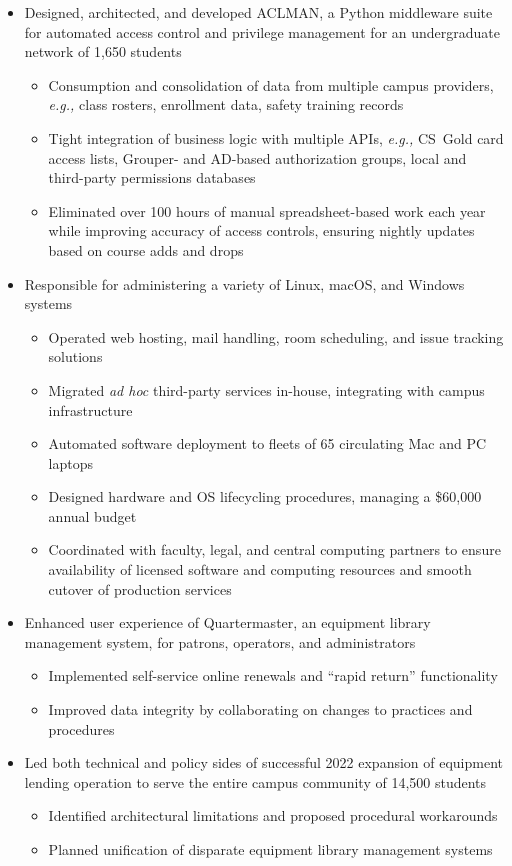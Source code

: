 \documentclass[11pt]{article}
\begin{document}
\begin{itemize}
	\item Designed, architected, and developed ACLMAN,
		a Python middleware suite for automated
		access control and privilege management
		for an undergraduate network of 1,650 students
		\begin{itemize}
			\item Consumption and consolidation of data from multiple campus providers, \emph{e.g.,}
				class rosters, enrollment data,
				safety training records
			\item Tight integration of business logic with multiple APIs, \emph{e.g.,}
				CS~Gold card access lists,
				Grouper- and AD-based authorization groups,
				local and third-party permissions databases
			\item Eliminated over 100 hours of manual spreadsheet-based work each year
				while improving accuracy of access controls,
				ensuring nightly updates based on course adds and drops
		\end{itemize}
	\item Responsible for administering a variety of
		Linux, macOS, and Windows systems
		\begin{itemize}
			\item Operated web hosting, mail handling,
				room scheduling, and issue tracking solutions
			\item Migrated \emph{ad hoc} third-party services in-house,
				integrating with campus infrastructure
			\item Automated software deployment to
				fleets of 65 circulating Mac and PC laptops
			\item Designed hardware and OS lifecycling procedures,
				managing a \$60,000 annual budget
			\item Coordinated with faculty, legal, and central computing partners
				to ensure availability of licensed software and computing resources
				and smooth cutover of production services
		\end{itemize}
	\item Enhanced user experience of Quartermaster,
		an equipment library management system,
		for patrons, operators, and administrators
		\begin{itemize}
			\item Implemented self-service online renewals
				and ``rapid return'' functionality
			\item Improved data integrity by collaborating on
				changes to practices and procedures
		\end{itemize}
	\item Led both technical and policy sides of
		successful 2022 expansion of equipment lending operation
		to serve the entire campus community
		of 14,500 students
		\begin{itemize}
			\item Identified architectural limitations
				and proposed procedural workarounds
			\item Planned unification of disparate
				equipment library management systems
		\end{itemize}
\end{itemize}
\end{document}
